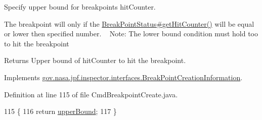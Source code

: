 Specify upper bound for breakpoint\textquotesingle{}s hit\+Counter. 

The breakpoint will only if the \hyperlink{interfacegov_1_1nasa_1_1jpf_1_1inspector_1_1interfaces_1_1_break_point_status_aa58761be50e0e0ecb7d6a7fb3ded8bf9}{Break\+Point\+Status\#get\+Hit\+Counter()} will be equal or lower then specified number. ~\newline
Note\+: The lower bound condition must hold too to hit the breakpoint

\begin{DoxyReturn}{Returns}
Upper bound of hit\+Counter to hit the breakpoint. 
\end{DoxyReturn}


Implements \hyperlink{interfacegov_1_1nasa_1_1jpf_1_1inspector_1_1interfaces_1_1_break_point_creation_information_a62389a60ba0878868c893d0a3d2efe56}{gov.\+nasa.\+jpf.\+inspector.\+interfaces.\+Break\+Point\+Creation\+Information}.



Definition at line 115 of file Cmd\+Breakpoint\+Create.\+java.


\begin{DoxyCode}
115                                            \{
116       \textcolor{keywordflow}{return} \hyperlink{classgov_1_1nasa_1_1jpf_1_1inspector_1_1client_1_1commands_1_1_cmd_breakpoint_create_1_1_console_breakpoint_creation_expression_afc19a93fec068e4fc73750253deea264}{upperBound};
117     \}
\end{DoxyCode}
